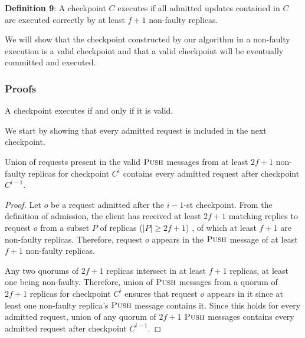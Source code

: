 \documentclass[twocolumn,10pt]{article}
\begin{document}
{\textbf{Definition 9}: A checkpoint $C$ executes if all admitted updates contained in $C$ are 
executed correctly by at least $f+1$ non-faulty replicas.

We will show that the checkpoint constructed by our algorithm in a non-faulty
execution is a valid checkpoint and that a valid checkpoint will be eventually
committed and executed. 

\subsubsection{Proofs}

\begin{theorem}
\label{thm:validCheckpoints}
A checkpoint executes if and only if it is valid.
\end{theorem}



We start by showing that every admitted request is included in the next
checkpoint.
 
\begin{lemma}
\label{lem:admittedUpdatesInNextCheckpoint}
Union of requests present in the valid $\textsc{Push}$ messages from at least $2f+1$
non-faulty replicas for
checkpoint $C^i$ contains every admitted request after checkpoint $C^{i-1}$.
\end{lemma}
\begin{proof}
Let $o$ be a request admitted after the $i-1$-st
checkpoint.
From the
definition of admission, the client has received at least $2f+1$ matching replies
to request $o$ from a subset $P$ of replicas ($|P| \geq 2f+1$) , of
which at least $f+1$ are non-faulty
replicas. Therefore, request $o$ appears in the $\textsc{Push}$ message of at least
$f+1$ non-faulty replicas. 

Any two quorums of $2f+1$ replicas intersect in at least $f+1$ replicas, 
at least one being non-faulty. Therefore, union of $\textsc{Push}$ messages from
a quorum of $2f+1$ replicas for checkpoint $C^i$ ensures that request $o$ appears in
it since at least one non-faulty replica's $\textsc{Push}$ message contains it. Since this 
holds for every admitted request, union of any quorum of $2f+1$ $\textsc{Push}$ 
messages contains every admitted request after checkpoint $C^{i-1}$.


\end{proof}}
\end{document}
